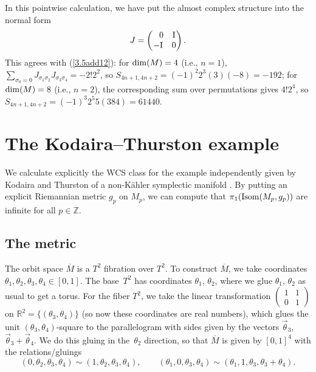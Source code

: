 \documentclass[10pt,a4paper]{amsart}
\numberwithin{equation}{section}
\theoremstyle{definition}
\newcommand{\BbR}{{\mathbb R}}
\newcommand{\BbZ}{{\mathbb Z}}
\newcommand{\Z}{\BbZ}
\newcommand{\R}{\BbR}
\newcommand{\om}{\overline{M}}
\newcommand{\omp}{M_p}
\begin{document}
In this pointwise calculation, we have
put the almost complex structure into the normal form
\[J = \begin{pmatrix} \hphantom{-} 0& \rm I\\ -\rm I&0\end{pmatrix}.\]
This agrees with (\ref{3.5add12}): for ${\rm dim}(M)=4$ (i.e., $n=1$), $\sum _{\sigma_0=0} J_{\sigma_1\sigma_2}J_{\sigma_3\sigma_4} =
-2!2^2$, so $S_{4n+1,4n+2} = (-1)^2 2^3(3) (-8) =-192$; for ${\rm dim}(M)=8$ (i.e., $n=2$), the corresponding
sum over permutations gives $4!2^4$, so
$S_{4n+1,4n+2} = (-1)^3 2^5 5 (384)= 61440$.

\section{The Kodaira--Thurston example}\label{section4}

We calculate explicitly the WCS class for the example independently given by Kodaira \cite{Kodaira} and
Thurston \cite{Thurston} of a non-K\"ahler symplectic manifold \smash{$\om^4$}. By putting an explicit Riemannian metric $g_p$ on $M_p$, we can compute that
$\pi_1({\rm Isom}(\omp, g_p))$ are infinite for all $p\in \Z$.


\subsection{The metric}%
The orbit space $\om$ is
a $T^2$ fibration over $T^2$. To construct $\om$, we take coordinates $\theta_1, \theta_2,\theta_3,\theta_4\in [0,1]$. The base~$T^2 $ has coordinates $\theta_1$, $\theta_2$, where we glue $\theta_1$, $\theta_2$ as usual to get
a torus. For the fiber $T^2$, we take the linear transformation
$\left(\begin{smallmatrix} 1&1\\0&1\end{smallmatrix}\right)$
on $\R^2 = \{(\theta_3,\theta_4)\}$ (so now these coordinates are real numbers), which glues
the unit $(\theta_3,\theta_4)$-square to the parallelogram with sides given by the vectors $\vec\theta_3$,
 $\vec \theta_3 + \vec\theta_4$. We do this gluing in the~$\theta_2$ direction, so that $\om$ is given by
 $[0,1]^4$ with the relations/gluings
 \[(0,\theta_2,\theta_3,\theta_4) \sim (1,\theta_2,\theta_3,\theta_4), \qquad
(\theta_1,0,\theta_3,\theta_4) \sim (\theta_1, 1, \theta_3, \theta_3+\theta_4).\]
\end{document}
